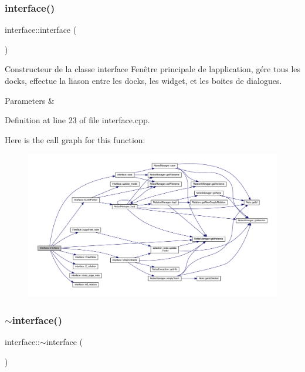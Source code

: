 \subsubsection{\texorpdfstring{interface()}{interface()}}
{\footnotesize\ttfamily interface\+::interface (\begin{DoxyParamCaption}{ }\end{DoxyParamCaption})}



Constructeur de la classe interface Fenêtre principale de l\textquotesingle{}application, gére tous les docks, effectue la liason entre les docks, les widget, et les boites de dialogues. 


\begin{DoxyParams}{Parameters}
{\em } & \\
\hline
\end{DoxyParams}


Definition at line 23 of file interface.\+cpp.

Here is the call graph for this function\+:\nopagebreak
\begin{figure}[H]
\begin{center}
\leavevmode
\includegraphics[width=350pt]{classinterface_a13e0ee4b9df1714d747d62ec46220c55_cgraph}
\end{center}
\end{figure}
\mbox{\label{classinterface_a8511f28c5bc5d3c24a24e9aaef4db502}} 
\subsubsection{\texorpdfstring{$\sim$interface()}{~interface()}}
{\footnotesize\ttfamily interface\+::$\sim$interface (\begin{DoxyParamCaption}{ }\end{DoxyParamCaption})}



